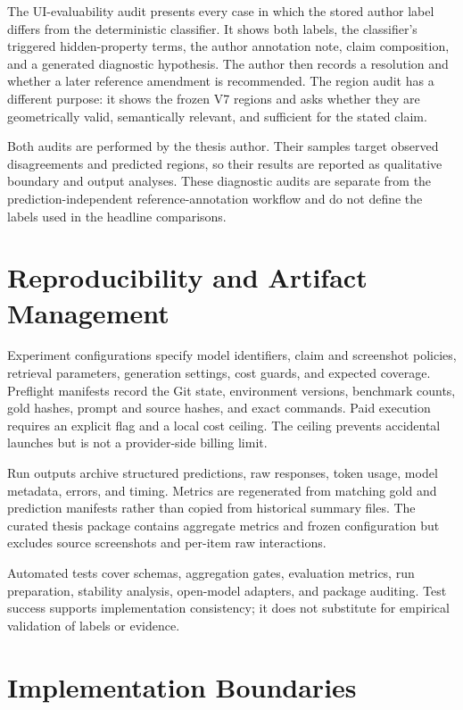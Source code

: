 The UI-evaluability audit presents every case in which the stored author label
differs from the deterministic classifier. It shows both labels, the
classifier's triggered hidden-property terms, the author annotation note, claim
composition, and a generated diagnostic hypothesis. The author then records a
resolution and whether a later reference amendment is recommended. The region
audit has a different purpose: it shows the frozen V7 regions and asks whether
they are geometrically valid, semantically relevant, and sufficient for the
stated claim.

Both audits are performed by the thesis author. Their samples target observed
disagreements and predicted regions, so their results are reported as
qualitative boundary and output analyses. These diagnostic audits are separate
from the prediction-independent reference-annotation workflow and do not
define the labels used in the headline comparisons.

\section{Reproducibility and Artifact Management}\label{reproducibility-and-artifact-management}

Experiment configurations specify model identifiers, claim and screenshot
policies, retrieval parameters, generation settings, cost guards, and expected
coverage. Preflight manifests record the Git state, environment versions,
benchmark counts, gold hashes, prompt and source hashes, and exact commands.
Paid execution requires an explicit flag and a local cost ceiling. The ceiling
prevents accidental launches but is not a provider-side billing limit.

Run outputs archive structured predictions, raw responses, token usage, model
metadata, errors, and timing. Metrics are regenerated from matching gold and
prediction manifests rather than copied from historical summary files. The
curated thesis package contains aggregate metrics and frozen configuration but
excludes source screenshots and per-item raw interactions.

Automated tests cover schemas, aggregation gates, evaluation metrics, run
preparation, stability analysis, open-model adapters, and package auditing. Test
success supports implementation consistency; it does not substitute for
empirical validation of labels or evidence.

\section{Implementation Boundaries}\label{implementation-boundaries}

